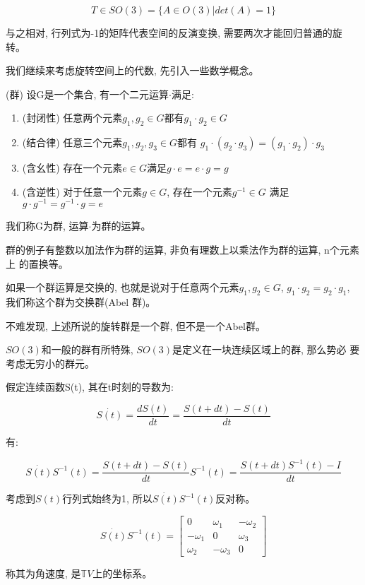 \documentclass{ctexart}
\numberwithin{equation}{subsection}
\numberwithin{theorem}{subsection}
\numberwithin{definition}{subsection}
\numberwithin{proof}{subsection}
\numberwithin{lemma}{subsection}
\numberwithin{example}{subsection}
\numberwithin{remark}{subsection}
\numberwithin{corollary}{subsection}
\numberwithin{exercise}{subsection}
\numberwithin{problem}{subsection}
\numberwithin{question}{section}
\numberwithin{method}{subsection}
\begin{document}
    \begin{equation}
        T \in SO(3) = \{A \in O(3) | det(A) = 1\}
    \end{equation}

    与之相对, 行列式为-1的矩阵代表空间的反演变换, 需要两次才能回归普通的旋转。

    我们继续来考虑旋转空间上的代数, 先引入一些数学概念。

    (群) 设G是一个集合, 有一个二元运算\(\cdot\)满足:
    \begin{enumerate}
        \item (封闭性) 任意两个元素\(g_1, g_2 \in G\)都有\(g_1 \cdot g_2 \in G\)
        \item (结合律) 任意三个元素\(g_1, g_2, g_3 \in G\)都有
            \(g_1 \cdot (g_2 \cdot g_3) = (g_1 \cdot g_2) \cdot g_3\)
        \item (含幺性) 存在一个元素\(e \in G\)满足\(g \cdot e = e \cdot g = g\)
        \item (含逆性) 对于任意一个元素\(g \in G\), 存在一个元素\(g^{-1} \in G\)
            满足\(g \cdot g^{-1} = g^{-1} \cdot g = e\)
    \end{enumerate}
    我们称G为群, 运算\(\cdot\)为群的运算。

    群的例子有整数以加法作为群的运算, 非负有理数上以乘法作为群的运算, n个元素上
    的置换等。

    如果一个群运算是交换的, 也就是说对于任意两个元素\(g_1, g_2 \in G\),
    \(g_1 \cdot g_2 = g_2 \cdot g_1\), 我们称这个群为交换群(Abel 群)。

    不难发现, 上述所说的旋转群是一个群, 但不是一个Abel群。

    $SO(3)$和一般的群有所特殊, $SO(3)$是定义在一块连续区域上的群, 那么势必
    要考虑无穷小的群元。

    假定连续函数S(t), 其在t时刻的导数为:

    \begin{equation}
        \dot{S(t)} = \frac{dS(t)}{dt} = \frac{S(t + dt) - S(t)}{dt}
    \end{equation}
    
    有:

    \begin{equation}
        \dot{S(t)}S^{-1}(t) = \frac{S(t + dt) - S(t)}{dt} S^{-1}(t) = \frac{S(t + dt)S^{-1}(t) - I}{dt}
    \end{equation}

    考虑到$S(t)$行列式始终为1, 所以$\dot{S(t)}S^{-1}(t)$反对称。

    \begin{equation}
        \dot{S(t)}S^{-1}(t) = 
        \begin{bmatrix}
            0 & \omega_1 & -\omega_2 \\
            -\omega_1 & 0 & \omega_3 \\
            \omega_2 & -\omega_3 & 0
        \end{bmatrix}
    \end{equation}

    称其为角速度, 是$\mathbb{T}V$上的坐标系。
\end{document}

